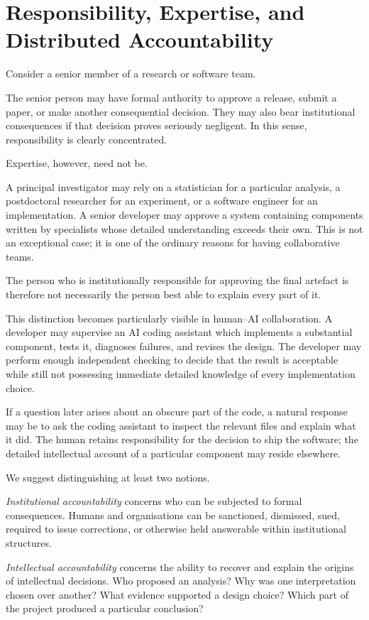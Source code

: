 \section{Responsibility, Expertise, and Distributed Accountability}

Consider a senior member of a research or software team.

The senior person may have formal authority to approve a release, submit a paper, or make another consequential decision. They may also bear institutional consequences if that decision proves seriously negligent. In this sense, responsibility is clearly concentrated.

Expertise, however, need not be.

A principal investigator may rely on a statistician for a particular analysis, a postdoctoral researcher for an experiment, or a software engineer for an implementation. A senior developer may approve a system containing components written by specialists whose detailed understanding exceeds their own. This is not an exceptional case; it is one of the ordinary reasons for having collaborative teams.

The person who is institutionally responsible for approving the final artefact is therefore not necessarily the person best able to explain every part of it.

This distinction becomes particularly visible in human--AI collaboration. A developer may supervise an AI coding assistant which implements a substantial component, tests it, diagnoses failures, and revises the design. The developer may perform enough independent checking to decide that the result is acceptable while still not possessing immediate detailed knowledge of every implementation choice.

If a question later arises about an obscure part of the code, a natural response may be to ask the coding assistant to inspect the relevant files and explain what it did. The human retains responsibility for the decision to ship the software; the detailed intellectual account of a particular component may reside elsewhere.

We suggest distinguishing at least two notions.

\emph{Institutional accountability} concerns who can be subjected to formal consequences. Humans and organisations can be sanctioned, dismissed, sued, required to issue corrections, or otherwise held answerable within institutional structures.

\emph{Intellectual accountability} concerns the ability to recover and explain the origins of intellectual decisions. Who proposed an analysis? Why was one interpretation chosen over another? What evidence supported a design choice? Which part of the project produced a particular conclusion?

